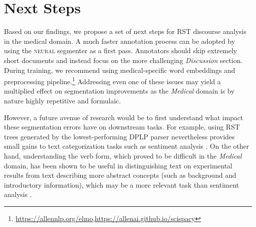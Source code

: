 \section{Next Steps}
\label{sec:next_steps}
Based on our findings, we propose a set of next steps for RST discourse analysis in the medical domain. A much faster annotation process can be adopted by using the \textsc{neural} segmenter as a first pass. Annotators should skip extremely short documents and instead focus on the more challenging \textit{Discussion} section. During training, we recommend using medical-specific word embeddings and preprocessing pipeline.\footnote{\url{https://allennlp.org/elmo},\url{https://allenai.github.io/scispacy}} 
Addressing even one of these issues may yield a multiplied effect on segmentation improvements as the \textit{Medical} domain is by nature highly repetitive and formulaic.

However, a future avenue of research would be to first understand what impact these segmentation errors have on downstream tasks. For example, using RST trees generated by the lowest-performing \textsc{DPLP} parser nevertheless provides small gains to text categorization tasks such as sentiment analysis \cite{Ji:2017}. On the other hand, understanding the verb form, which proved to be difficult in the \textit{Medical} domain, has been shown to be useful in distinguishing text on experimental results from text describing more abstract concepts (such as background and introductory information), which may be a more relevant task than sentiment analysis \cite{deWaard:2012}. 

